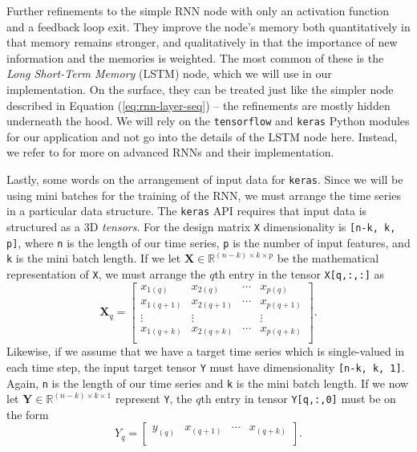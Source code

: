 \documentclass[]{article}
\begin{document}
Further refinements to the simple RNN node with only an activation function and a feedback loop exit. They improve the node's memory both quantitatively in that memory remains stronger, and qualitatively in that the importance of new information and the memories is weighted. The most common of these is the \textit{Long Short-Term Memory} (LSTM) node, which we will use in our implementation. On the surface, they can be treated just like the simpler node described in Equation (\ref{eq:rnn-layer-seq}) -- the refinements are mostly hidden underneath the hood. We will rely on the \lstinline|tensorflow| and \lstinline|keras| Python modules for our application and not go into the details of the LSTM node here. Instead, we refer to \cite{geron2019hands} for more on advanced RNNs and their implementation.

Lastly, some words on the arrangement of input data for \lstinline|keras|. Since we will be using mini batches for the training of the RNN, we must arrange the time series in a particular data structure. The \lstinline|keras| API requires that input data is structured as a 3D \textit{tensors}. For the design matrix \lstinline|X| dimensionality is \lstinline|[n-k, k, p]|, where \lstinline|n| is the length of our time series, \lstinline|p| is the number of input features, and \lstinline|k| is the mini batch length. If we let $\mathbf{X} \in \mathbb{R}^{(n-k) \times k \times p}$ be the mathematical representation of \lstinline|X|, we must arrange the $q$th entry in the tensor \lstinline|X[q,:,:]| as
\begin{equation} \label{eq:X-tensor}
\mathbf{X}_q = 
\left[ 
	\begin{array}{cccc}
		x_{1(q)}	&x_{2(q)}	&\cdots		&x_{p(q)}	\\
		x_{1(q+1)}	&x_{2(q+1)}	&\cdots		&x_{p(q+1)}	\\
		\vdots		&\vdots		&			&\vdots		\\
		x_{1(q+k)}	&x_{2(q+k)}	&\cdots		&x_{p(q+k)}	\\
	\end{array}
\right].
\end{equation}
Likewise, if we assume that we have a target time series which is single-valued in each time step, the input target tensor \lstinline|Y| must have dimensionality \lstinline|[n-k, k, 1]|. Again, \lstinline|n| is the length of our time series and \lstinline|k| is the mini batch length. If we now let $\mathbf{Y} \in \mathbb{R}^{(n-k) \times k \times 1}$ represent \lstinline|Y|, the $q$th entry in tensor \lstinline|Y[q,:,0]| must be on the form
\begin{equation} \label{eq:Y-tensor}
Y_q = 
\left[ 
	\begin{array}{cccc}
		y_{(q)}	&x_{(q+1)}	&\cdots		&x_{(q+k)}	\\
	\end{array}
\right].
\end{equation}
\end{document}
